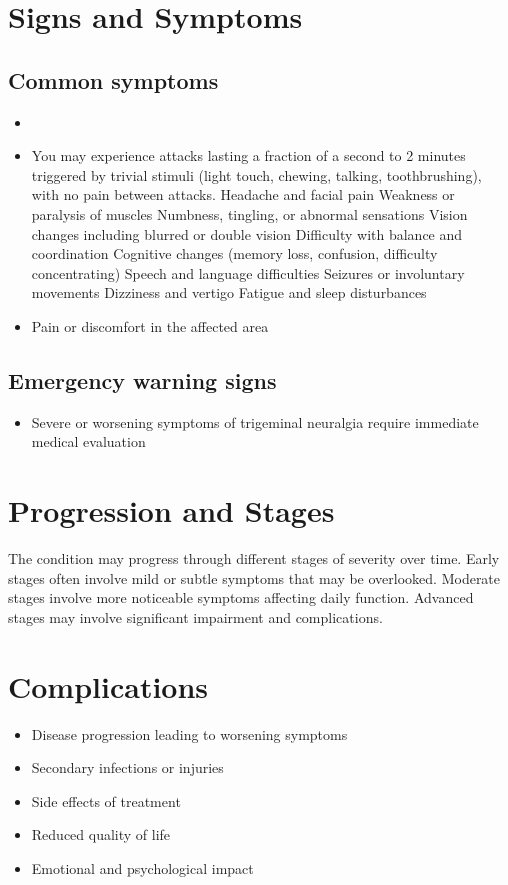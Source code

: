 \section{Signs and Symptoms}

\subsection{Common symptoms}
\begin{itemize}[noitemsep]
  \item \item You may experience attacks lasting a fraction of a second to 2 minutes triggered by trivial stimuli (light touch, chewing, talking, toothbrushing), with no pain between attacks. Headache and facial pain Weakness or paralysis of muscles Numbness, tingling, or abnormal sensations Vision changes including blurred or double vision Difficulty with balance and coordination Cognitive changes (memory loss, confusion, difficulty concentrating) Speech and language difficulties Seizures or involuntary movements Dizziness and vertigo Fatigue and sleep disturbances

  \item Pain or discomfort in the affected area
  \end{itemize}

\subsection{Emergency warning signs}
\begin{itemize}[noitemsep]
  \item Severe or worsening symptoms of trigeminal neuralgia require immediate medical evaluation
\end{itemize}
\section{Progression and Stages}
The condition may progress through different stages of severity over time. Early stages often involve mild or subtle symptoms that may be overlooked. Moderate stages involve more noticeable symptoms affecting daily function. Advanced stages may involve significant impairment and complications.
\section{Complications}
\begin{itemize}[noitemsep]
  \item Disease progression leading to worsening symptoms
  \item Secondary infections or injuries
  \item Side effects of treatment
  \item Reduced quality of life
  \item Emotional and psychological impact
\end{itemize}
